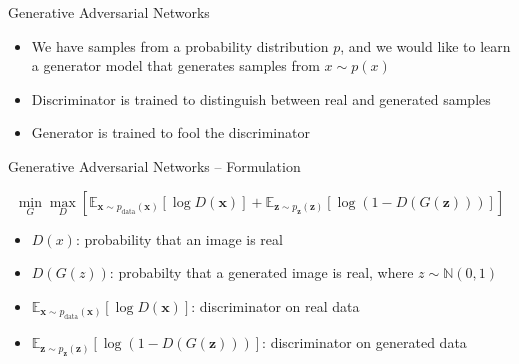 \begin{frame}{Generative Adversarial Networks}
\protect\hypertarget{generative-adversarial-networks}{}

\begin{itemize}
\tightlist
\item
  We have samples from a probability distribution \(p\), and we would
  like to learn a generator model that generates samples from
  \(x \sim p(x)\)
\item
  Discriminator is trained to distinguish between real and generated
  samples
\item
  Generator is trained to fool the discriminator 
\end{itemize}


\end{frame}

\begin{frame}{Generative Adversarial Networks -- Formulation}
\protect\hypertarget{generative-adversarial-networks-formulation}{}

\[ \min _{G} \max _{D} \left[\mathbb{E}_{\boldsymbol{x} \sim p_{\text {data}}(\boldsymbol{x})}[\log D(\boldsymbol{x})]+\mathbb{E}_{\boldsymbol{z} \sim p_{\boldsymbol{z}}(\boldsymbol{z})}[\log (1-D(G(\boldsymbol{z})))]\right] \]

\begin{itemize}
\tightlist
\item
  \(D(x)\): probability that an image is real
\item
  \(D(G(z))\): probabilty that a generated image is real, where
  \(z \sim \mathbb{N}(0, 1)\)
\item
  \(\mathbb{E}_{\boldsymbol{x} \sim p_{\text {data}}(\boldsymbol{x})}[\log D(\boldsymbol{x})]\):
  discriminator on real data
\item
  \(\mathbb{E}_{\boldsymbol{z} \sim p_{\boldsymbol{z}}(\boldsymbol{z})}[\log (1-D(G(\boldsymbol{z})))]\):
  discriminator on generated data
\end{itemize}

\end{frame}

